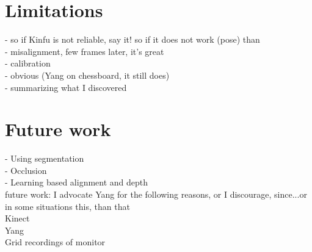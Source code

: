 \documentclass{ucl_thesis}
\begin{document}
\section{Limitations} \label{sec:limitations}
	- so if Kinfu is not reliable, say it! so if it does not work (pose) than \\
	- misalignment, few frames later, it's great \\
	- calibration \\
    - obvious (Yang on chessboard, it still does) \\
    - summarizing what I discovered \\
    
\section{Future work}
- Using segmentation \citep{Silberman:ECCV12} \\
- Occlusion \citep{Hoiem:2011} \\
- Learning based alignment and depth \citep{Herrera:LearnedJointMRF} \\

future work: I advocate Yang for the following reasons, or I discourage, since...or in some situations this, than that \\
Kinect \\
Yang \\
Grid recordings of monitor\\
\end{document}
